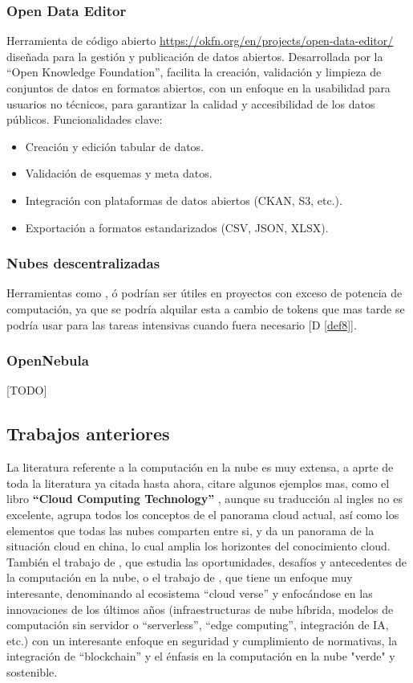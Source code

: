 \subsubsection*{Open Data Editor}
	Herramienta de código abierto \url{https://okfn.org/en/projects/open-data-editor/} diseñada para la gestión y publicación de datos abiertos. Desarrollada por la ``Open Knowledge Foundation'', facilita la creación, validación y limpieza de conjuntos de datos en formatos abiertos, con un enfoque en la usabilidad para usuarios no técnicos, para garantizar la calidad y accesibilidad de los datos públicos. Funcionalidades clave:
	\begin{itemize}
		\item Creación y edición tabular de datos.
		\item Validación de esquemas y meta datos.
		\item Integración con plataformas de datos abiertos (CKAN, S3, etc.).
		\item Exportación a formatos estandarizados (CSV, JSON, XLSX).
	\end{itemize}

\subsubsection*{Nubes descentralizadas}
Herramientas como \citep{GolemNetwork}, \citep{akashCloud} ó \citep{rendernetwork} podrían ser útiles en proyectos con exceso de potencia de computación, ya que se podría alquilar esta a cambio de tokens que mas tarde se podría usar para las tareas intensivas cuando fuera necesario [D \ref{def8}].

\subsubsection*{OpenNebula}
 
 [TODO]
 
\subsection{Trabajos anteriores}

La literatura referente a la computación en la nube es muy extensa, a aprte de toda la literatura ya citada hasta ahora, citare algunos ejemplos mas, como el libro \textbf{``Cloud Computing Technology''} \citep{huawei2023cloud}, aunque su traducción al ingles no es excelente, agrupa todos los conceptos de el panorama cloud actual, así como los elementos que todas las nubes comparten entre si, y da un panorama de la situación cloud en china, lo cual amplia los horizontes del conocimiento cloud. También el trabajo de \citep{nigro2022}, que estudia las oportunidades, desafíos y antecedentes de la computación en la nube, o el trabajo de \citep{bommala2024}, que tiene un enfoque muy interesante, denominando al ecosistema ``cloud verse'' y enfocándose en las innovaciones de los últimos años (infraestructuras de nube híbrida, modelos de computación sin servidor o ``serverless'', ``edge computing'', integración de IA, etc.) con un interesante  enfoque en seguridad y cumplimiento de normativas, la integración de ``blockchain'' y el énfasis en la computación en la nube "verde" y sostenible. 

